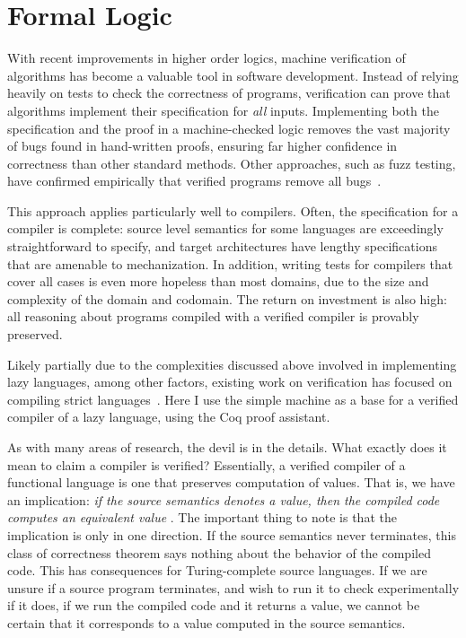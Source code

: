 \section{Formal Logic} \label{sec:background}

With recent improvements in higher order logics, machine verification of
algorithms has become a valuable tool in software development. Instead of
relying heavily on tests to check the correctness of programs, verification can
prove that algorithms implement their specification for \emph{all} inputs.
Implementing both the specification and the proof in a machine-checked logic
removes the vast majority of bugs found in hand-written proofs, ensuring far
higher confidence in correctness than other standard methods. Other approaches,
such as fuzz testing, have confirmed empirically that verified programs remove
all bugs~\cite{yangfuzz}.

This approach applies particularly well to compilers. Often, the specification
for a compiler is complete: source level semantics for some languages are
exceedingly straightforward to specify, and target architectures have lengthy
specifications that are amenable to mechanization. In addition, writing tests
for compilers that cover all cases is even more hopeless than most domains, due
to the size and complexity of the domain and codomain. The return on investment
is also high: all reasoning about programs compiled with a verified compiler is
provably preserved. 

Likely partially due to the complexities discussed above involved in
implementing lazy languages, among other factors, existing work on verification
has focused on compiling strict languages~\cite{chlipala2007certified,
leroy2012compcert, cakeml14}. Here I use the simple \ce machine as a base for a
verified compiler of a lazy language, using the Coq proof assistant. 

As with many areas of research, the devil is in the details. What exactly does
it mean to claim a compiler is verified?  Essentially, a verified compiler of a
functional language is one that preserves computation of values. That is, we
have an implication: \emph{if the source semantics denotes a value, then the
compiled code computes an equivalent value} \cite{chlipala2007certified}. The
important thing to note is that the implication is only in one direction. If the
source semantics never terminates, this class of correctness theorem says
nothing about the behavior of the compiled code. This has consequences for
Turing-complete source languages. If we are unsure if a source program
terminates, and wish to run it to check experimentally if it does, if we run the
compiled code and it returns a value, we cannot be certain that it corresponds
to a value computed in the source semantics. 

